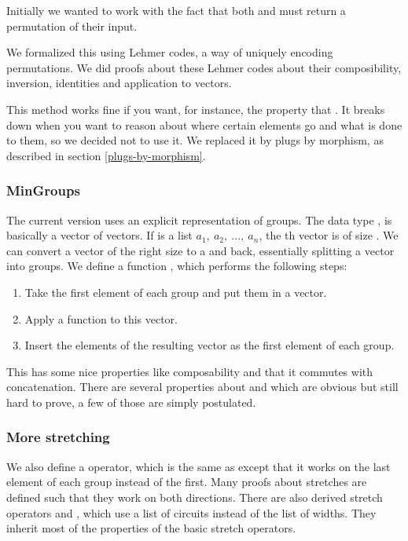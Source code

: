 Initially we wanted to work with the fact that both  
 and    must return a permutation of their
input.

We formalized this using Lehmer codes, a way of uniquely encoding
permutations.
We did proofs about these Lehmer codes about their composibility,
inversion, identities and application to vectors.

This method works fine if you want, for instance, the property that
.
It breaks down when you want to reason about where certain elements go
and what is done to them, so we decided not to use it.
We replaced it by plugs by morphism, as described in section
\ref{plugs-by-morphism}.

\subsubsection{MinGroups}\label{mingroups}

The current version uses an explicit representation of groups.
The data type    , is basically a
vector of vectors.
If  is a list $a_1,\ a_2,\ ...,\ a_n$, the th vector is
of size  \AF{+} .
We can convert a vector of the right size to a  and
back, essentially splitting a vector into groups.
We define a function , which performs
the following steps:

\begin{enumerate}
\item Take the first element of each group and put them in a vector.
\item Apply a function to this vector.
\item Insert the elements of the resulting vector as the first element of
  each group.
\end{enumerate}

This  has some nice properties like composability and
that it commutes with concatenation.
There are several properties about  and 
which are obvious but still hard to prove, a few of those are simply
postulated.

\subsubsection{More stretching}\label{more-stretching}

We also define a  operator, which is the same as  except
that it works on the last element of each group instead of the first.
Many proofs about stretches are defined such that they work on both
directions.
There are also derived stretch operators  and , which use
a list of circuits instead of the list of widths.
They inherit most of the properties of the basic stretch operators.

